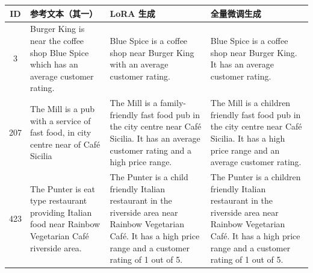 \begin{tabularx}{\textwidth}{c X X X}
\toprule
ID & 参考文本（其一） & LoRA 生成 & 全量微调生成 \\
\midrule
3 & Burger King is near the coffee shop Blue Spice which has an average customer rating. & Blue Spice is a coffee shop near Burger King with an average customer rating. & Blue Spice is a coffee shop near Burger King. It has an average customer rating. \\
207 & The Mill is a pub with a service of fast food, in city centre near of Café Sicilia & The Mill is a family-friendly fast food pub in the city centre near Café Sicilia. It has an average customer rating and a high price range. & The Mill is a children friendly fast food pub in the city centre near Café Sicilia. It has a high price range and an average customer rating. \\
423 & The Punter is eat type restaurant providing Italian food near Rainbow Vegetarian Café riverside area. & The Punter is a child friendly Italian restaurant in the riverside area near Rainbow Vegetarian Café. It has a high price range and a customer rating of 1 out of 5. & The Punter is a children friendly Italian restaurant in the riverside area near Rainbow Vegetarian Café. It has a high price range and a customer rating of 1 out of 5. \\
\bottomrule
\end{tabularx}
